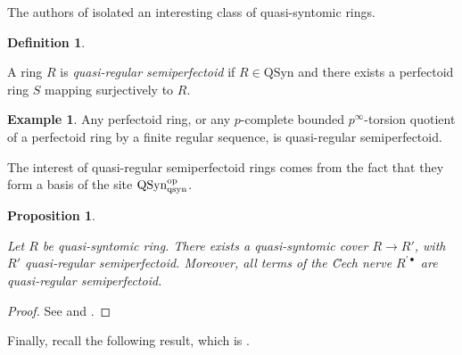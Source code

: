 \documentclass{amsart}
\theoremstyle{plain}
\newtheorem{proposition}[theorem]{Proposition}
\theoremstyle{definition}
\newtheorem{definition}[theorem]{Definition}
\newtheorem{example}[theorem]{Example}
\begin{document}
The authors of \cite{bhatt_morrow_scholze_topological_hochschild_homology} isolated an interesting class of quasi-syntomic rings.

\begin{definition}
\label{sec:quasi-syn-rings-definition-quasi-regular semiperfectoid}

A ring $R$ is \textit{quasi-regular semiperfectoid} if $R \in \mathrm{QSyn}$ and
there exists a perfectoid ring $S$ mapping surjectively to $R$.
\end{definition}

\begin{example}
  \label{sec:quasi-syntomic-rings-example-quasi-regular-semiperfectoids}
Any perfectoid ring, or any $p$-complete bounded $p^{\infty}$-torsion quotient of a perfectoid ring by a finite regular
sequence, is quasi-regular semiperfectoid.
\end{example}

The interest of quasi-regular semiperfectoid rings comes from the fact that they form a basis of the site $\mathrm{QSyn}_{\rm qsyn}^{\rm op}$. 

\begin{proposition}
\label{sec:quasi-syn-rings-proposition-quasi-regular semiperfectoid-basis}

Let $R$ be quasi-syntomic ring. There exists a quasi-syntomic cover $R \to R'$, with $R'$ quasi-regular semiperfectoid. Moreover, all terms of the \u{C}ech nerve $R^{'\bullet}$ are quasi-regular semiperfectoid. 
\end{proposition}
\begin{proof}
See \cite[Lemma 4.27]{bhatt_morrow_scholze_topological_hochschild_homology} and \cite[Lemma 4.29]{bhatt_morrow_scholze_topological_hochschild_homology}.
\end{proof}

Finally, recall the following result, which is \cite[Prop 7.11]{bhatt_scholze_prisms_and_prismatic_cohomology}.
\end{document}
